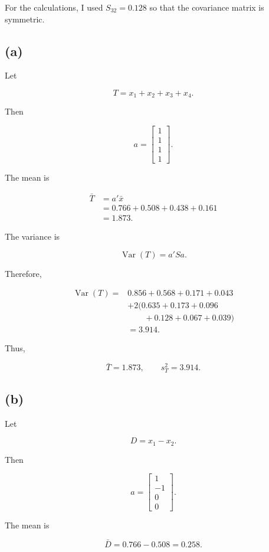 \documentclass[12pt]{article}
\begin{document}
For the calculations, I used $S_{32}=0.128$ so that the covariance matrix is symmetric.

\subsection*{(a)}

Let

$$
T=x_1+x_2+x_3+x_4.
$$

Then

$$
a=
\begin{bmatrix}
1\\1\\1\\1
\end{bmatrix}.
$$

The mean is

$$
\begin{aligned}
\bar{T}
&=a'\bar{x}\\
&=0.766+0.508+0.438+0.161\\
&=\boxed{1.873}.
\end{aligned}
$$

The variance is

$$
\operatorname{Var}(T)=a'Sa.
$$

Therefore,

$$
\begin{aligned}
\operatorname{Var}(T)
={}&0.856+0.568+0.171+0.043\\
&+2(0.635+0.173+0.096\\
&\qquad+0.128+0.067+0.039)\\
&=\boxed{3.914}.
\end{aligned}
$$

Thus,

$$
\boxed{\bar{T}=1.873,\qquad s_T^2=3.914}.
$$

\subsection*{(b)}

Let

$$
D=x_1-x_2.
$$

Then

$$
a=
\begin{bmatrix}
1\\-1\\0\\0
\end{bmatrix}.
$$

The mean is

$$
\bar{D}
=
0.766-0.508
=
\boxed{0.258}.
$$
\end{document}
